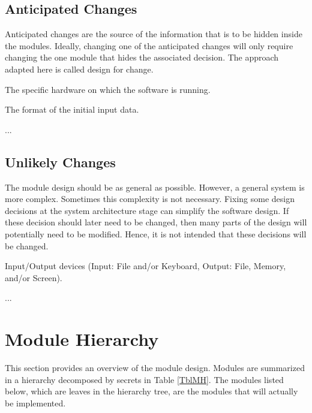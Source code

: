 \documentclass[12pt, titlepage]{article}
\newcounter{acnum}
\newcommand{\actheacnum}{AC\theacnum}
\newcounter{ucnum}
\newcommand{\uctheucnum}{UC\theucnum}
\begin{document}
\subsection{Anticipated Changes} \label{SecAchange}

Anticipated changes are the source of the information that is to be hidden inside the modules.
Ideally, changing one of the anticipated changes will only require changing the one module that
hides the associated decision. The approach adapted here is called design for change.

\begin{description}
	\item[ \actheacnum \label{acHardware}:] The specific
		hardware on which the software is running.
	\item[ \actheacnum \label{acInput}:] The format of the
		initial input data.
	\item ...
\end{description}

\subsection{Unlikely Changes} \label{SecUchange}

The module design should be as general as possible. However, a general system is more complex.
Sometimes this complexity is not necessary. Fixing some design decisions at the system architecture
stage can simplify the software design. If these decision should later need to be changed, then
many parts of the design will potentially need to be modified. Hence, it is not intended that these
decisions will be changed.

\begin{description}
	\item[ \uctheucnum \label{ucIO}:] Input/Output devices
		(Input: File and/or Keyboard, Output: File, Memory, and/or Screen).
	\item ...
\end{description}

\section{Module Hierarchy} \label{SecMH}

This section provides an overview of the module design. Modules are summarized in a hierarchy
decomposed by secrets in Table \ref{TblMH}. The modules listed below, which are leaves in the
hierarchy tree, are the modules that will actually be implemented.
\end{document}
